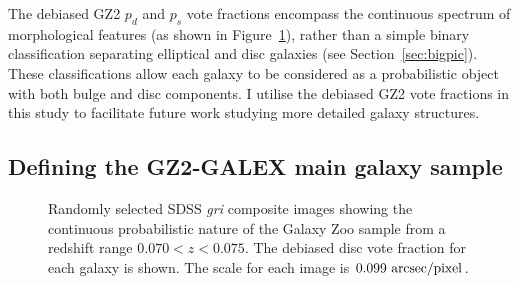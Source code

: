 The debiased GZ2 $p_d$ and $p_s$ vote fractions encompass the continuous spectrum of morphological features (as shown in Figure~\ref{fig:mosaic}), rather than a simple binary classification separating elliptical and disc galaxies (see Section~\ref{sec:bigpic}). These classifications allow each galaxy to be considered as a probabilistic object with both bulge and disc components. I utilise the debiased GZ2 vote fractions in this study to facilitate future work studying more detailed galaxy structures. 

\subsection{Defining the GZ2-GALEX main galaxy sample}\label{sec:defsample}

\begin{figure}
\caption[Example SDSS images with GZ2 vote fractions]{Randomly selected SDSS \emph{gri} composite images showing the continuous probabilistic nature of the Galaxy Zoo sample from a redshift range $0.070 < z < 0.075$. The debiased disc vote fraction for each galaxy is shown. The scale for each image is $0.099~\rm{arcsec/pixel}$.}
\label{fig:mosaic}
\end{figure}

